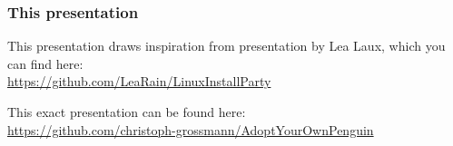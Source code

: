 \begin{frame}
	\frametitle{This presentation}
	
	This presentation draws inspiration from presentation by Lea Laux, which you can find here:\\[.2\baselineskip]
	\url{https://github.com/LeaRain/LinuxInstallParty}
	
	\vfill
	
	This exact presentation can be found here:\\[.2\baselineskip]	
	\url{https://github.com/christoph-grossmann/AdoptYourOwnPenguin}
	
\end{frame}
